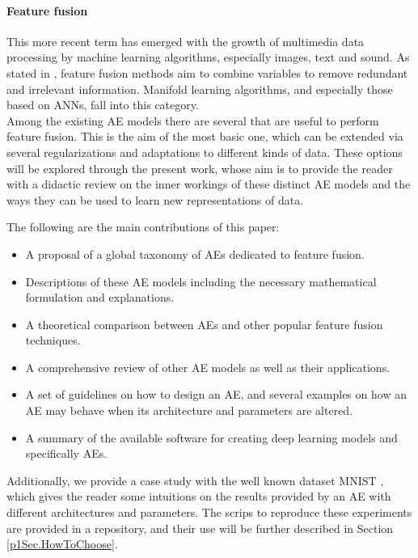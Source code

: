     \paragraph{Feature fusion }
    This more recent term has emerged with the growth of multimedia data processing by machine learning algorithms, especially images, text and sound. As stated in , feature fusion methods aim to combine variables to remove redundant and irrelevant information. Manifold learning algorithms, and especially those based on ANNs, fall into this category. \\

    Among the existing AE models there are several that are useful to perform feature fusion. This is the aim of the most basic one, which can be extended via several regularizations and adaptations to different kinds of data. These options will be explored through the present work, whose aim is to provide the reader with a didactic review on the inner workings of these distinct AE models and the ways they can be used to learn new representations of data.

    The following are the main contributions of this paper:
    \begin{itemize}
	    \item A proposal of a global taxonomy of AEs dedicated to feature fusion.
	
	    \item Descriptions of these AE models including the necessary mathematical formulation and explanations.
	
	    \item A theoretical comparison between AEs and other popular feature fusion techniques.
	    
	    \item A comprehensive review of other AE models as well as their applications.
	      
	    \item A set of guidelines on how to design an AE, and several examples on how an AE may behave when its architecture and parameters are altered.

            \item A summary of the available software for creating deep learning models and specifically AEs.
    \end{itemize}

    Additionally, we provide a case study with the well known dataset MNIST , which gives the reader some intuitions on the results provided by an AE with different architectures and parameters. The scrips to reproduce these experiments are provided in a repository, and their use will be further described in Section \ref{p1Sec.HowToChoose}.

